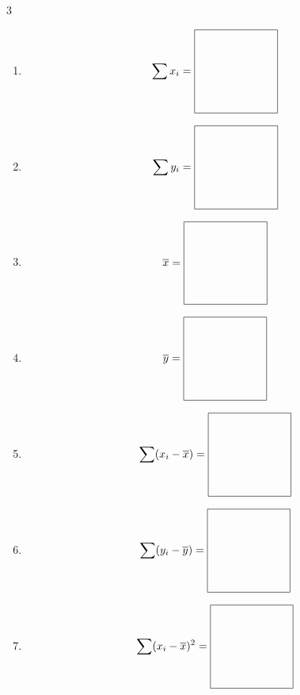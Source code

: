 \documentclass[12pt, xcolor=dvipsnames,svgnames,x11names]{article}
\begin{document}
\begin{multicols}{3}
\begin{enumerate}
 \item \begin{equation*}
    \sum x_i = \vcenter{\hbox{\begin{tikzpicture}
    \draw (0,0) rectangle (75pt,75pt);
    \end{tikzpicture}}}
    \end{equation*}

\item \begin{equation*}
    \sum y_i = \vcenter{\hbox{\begin{tikzpicture}
    \draw (0,0) rectangle (75pt,75pt);
    \end{tikzpicture}}}
    \end{equation*}

    \item \begin{equation*}
    \xbar = \vcenter{\hbox{\begin{tikzpicture}
    \draw (0,0) rectangle (75pt,75pt);
    \end{tikzpicture}}}
    \end{equation*}

\item \begin{equation*}
    \ybar = \vcenter{\hbox{\begin{tikzpicture}
    \draw (0,0) rectangle (75pt,75pt);
    \end{tikzpicture}}}
    \end{equation*}

\item \begin{equation*}
     \sum (x_i -\xbar) = \vcenter{\hbox{\begin{tikzpicture}
    \draw (0,0) rectangle (75pt,75pt);
    \end{tikzpicture}}}
    \end{equation*}
    
\item \begin{equation*}
     \sum (y_i -\ybar) = \vcenter{\hbox{\begin{tikzpicture}
    \draw (0,0) rectangle (75pt,75pt);
    \end{tikzpicture}}}
    \end{equation*}

\item \begin{equation*}
     \sum (x_i -\xbar)^2 = \vcenter{\hbox{\begin{tikzpicture}
    \draw (0,0) rectangle (75pt,75pt);
    \end{tikzpicture}}}
    \end{equation*}


\end{enumerate}
\end{multicols}
\end{document}
